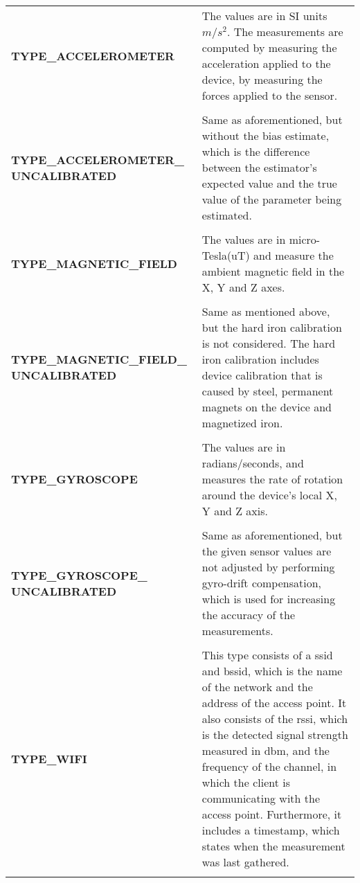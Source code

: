 \begin{longtable}{ p{}  p{}}

\textbf{TYPE\_ACCELEROMETER} & The values are in \acrshort{SI} units $m/s^2$. The measurements are computed by measuring the acceleration applied to the device, by measuring the forces applied to the sensor\cite{sensorevent}.
\\\\

\textbf{TYPE\_ACCELEROMETER\_ \newline UNCALIBRATED} & Same as aforementioned, but without the bias estimate, which is the difference between the estimator's expected value and the true value of the parameter being estimated\cite{sensorevent}.
\\\\

\textbf{TYPE\_MAGNETIC\_FIELD} & The values are in micro-Tesla(uT) and measure the ambient magnetic field in the X, Y and Z axes\cite{sensorevent}.
\\\\


\textbf{TYPE\_MAGNETIC\_FIELD\_ \newline UNCALIBRATED} & Same as mentioned above, but the hard iron calibration is not considered. The hard iron calibration includes device calibration that is caused by steel, permanent magnets on the device and magnetized iron\cite{sensorevent}.
\\\\


\textbf{TYPE\_GYROSCOPE} & The values are in radians/seconds, and measures the rate of rotation around the device's local X, Y and Z axis\cite{sensorevent}.
\\\\

\textbf{TYPE\_GYROSCOPE\_ \newline UNCALIBRATED} & Same as aforementioned, but the given sensor values are not adjusted by performing gyro-drift compensation, which is used for increasing the accuracy of the measurements\cite{sensorevent}.
\\\\

\textbf{TYPE\_WIFI} &  This type consists of a \gls{ssid} and \gls{bssid}, which is the name of the network and the address of the access point. It also consists of the \gls{rssi}, which is the detected signal strength measured in \gls{dbm}, and the frequency of the channel, in which the client is communicating with the access point. Furthermore, it includes a timestamp, which states when the measurement was last gathered.\cite{wifiandroid}
\\\\


\end{longtable}
